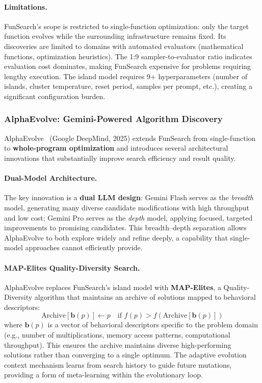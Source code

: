 \paragraph{Limitations.}
FunSearch's scope is restricted to single-function optimization: only the target function evolves while the surrounding infrastructure remains fixed. Its discoveries are limited to domains with automated evaluators (mathematical functions, optimization heuristics). The 1:9 sampler-to-evaluator ratio indicates evaluation cost dominates, making FunSearch expensive for problems requiring lengthy execution. The island model requires 9+ hyperparameters (number of islands, cluster temperature, reset period, samples per prompt, etc.), creating a significant configuration burden.


\subsubsection{AlphaEvolve: Gemini-Powered Algorithm Discovery}

AlphaEvolve~\citep{alphaevolve2025} (Google DeepMind, 2025) extends FunSearch from single-function to \textbf{whole-program optimization} and introduces several architectural innovations that substantially improve search efficiency and result quality.

\paragraph{Dual-Model Architecture.}
The key innovation is a \textbf{dual LLM design}: Gemini Flash serves as the \emph{breadth} model, generating many diverse candidate modifications with high throughput and low cost; Gemini Pro serves as the \emph{depth} model, applying focused, targeted improvements to promising candidates. This breadth--depth separation allows AlphaEvolve to both explore widely and refine deeply, a capability that single-model approaches cannot efficiently provide.

\paragraph{MAP-Elites Quality-Diversity Search.}
AlphaEvolve replaces FunSearch's island model with \textbf{MAP-Elites}, a Quality-Diversity algorithm that maintains an archive of solutions mapped to behavioral descriptors:
\begin{equation}
\text{Archive}[\mathbf{b}(p)] \leftarrow p \quad \text{if } f(p) > f(\text{Archive}[\mathbf{b}(p)])
\end{equation}
where $\mathbf{b}(p)$ is a vector of behavioral descriptors specific to the problem domain (e.g., number of multiplications, memory access patterns, computational throughput). This ensures the archive maintains diverse high-performing solutions rather than converging to a single optimum. The adaptive evolution context mechanism learns from search history to guide future mutations, providing a form of meta-learning within the evolutionary loop.

